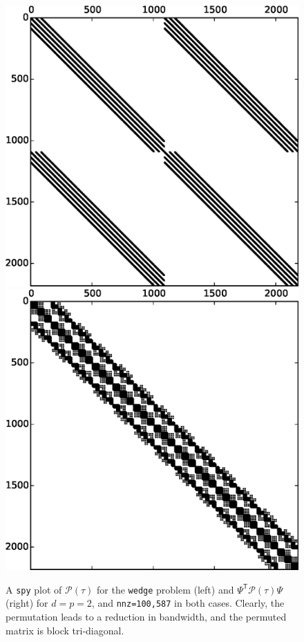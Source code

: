 {\begin{figure}[H]
\centering
\includegraphics[width=0.49\columnwidth]{P_25_25-crop} \hfill
\includegraphics[width=0.49\columnwidth]{P_25_25_perm-crop}
\caption{A \texttt{spy} plot of $\mathcal{P}(\tau)$ for the \texttt{wedge} problem (left) and $\Psi^\mathsf{T} \mathcal{P}(\tau) \Psi$ (right) for $d=p=2$, and \texttt{nnz=100,587} in both cases. Clearly, the permutation leads to a reduction in bandwidth, and the permuted matrix is block tri-diagonal.}
\label{fig:perm}
\end{figure}

}
